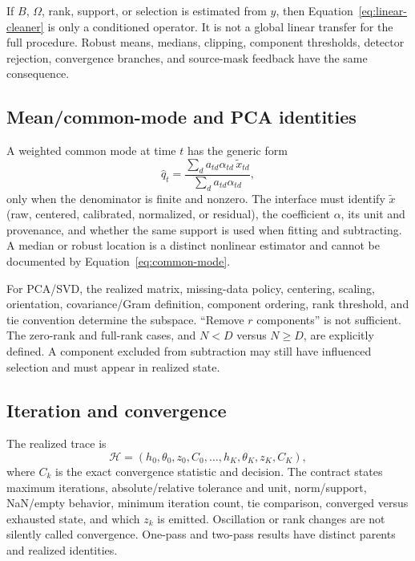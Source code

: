 \documentclass[11pt]{article}
\begin{document}
If $B$, $\Omega$, rank, support, or selection is estimated from $y$, then
Equation~\eqref{eq:linear-cleaner} is only a conditioned operator.  It is not
a global linear transfer for the full procedure.  Robust means, medians,
clipping, component thresholds, detector rejection, convergence branches,
and source-mask feedback have the same consequence.

\subsection{Mean/common-mode and PCA identities}

A weighted common mode at time $t$ has the generic form
\begin{equation}
 \widehat q_t=
 \frac{\sum_d a_{td}\alpha_{td}\,\widetilde x_{td}}
      {\sum_d a_{td}\alpha_{td}},
 \label{eq:common-mode}
\end{equation}
only when the denominator is finite and nonzero.  The interface must identify
$\widetilde x$ (raw, centered, calibrated, normalized, or residual), the
coefficient $\alpha$, its unit and provenance, and whether the same support is
used when fitting and subtracting.  A median or robust location is a distinct
nonlinear estimator and cannot be documented by Equation~\eqref{eq:common-mode}.

For PCA/SVD, the realized matrix, missing-data policy, centering, scaling,
orientation, covariance/Gram definition, component ordering, rank threshold,
and tie convention determine the subspace.  ``Remove $r$ components'' is not
sufficient.  The zero-rank and full-rank cases, and $N<D$ versus $N\ge D$,
are explicitly defined.  A component excluded from subtraction may still
have influenced selection and must appear in realized state.

\subsection{Iteration and convergence}

The realized trace is
\begin{equation}
 \mathcal H=(h_0,\theta_0,z_0,C_0,\ldots,h_K,\theta_K,z_K,C_K),
 \label{eq:iteration-trace}
\end{equation}
where $C_k$ is the exact convergence statistic and decision.  The contract
states maximum iterations, absolute/relative tolerance and unit, norm/support,
NaN/empty behavior, minimum iteration count, tie comparison, converged versus
exhausted state, and which $z_k$ is emitted.  Oscillation or rank changes are
not silently called convergence.  One-pass and two-pass results have distinct
parents and realized identities.
\end{document}

